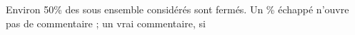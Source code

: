Environ 50\% des sous ensemble considérés sont fermés. %
Un \% échappé n'ouvre pas de commentaire ; un vrai commentaire, si %
